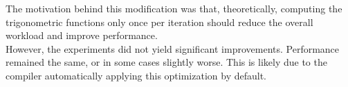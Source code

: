 \noindent
The motivation behind this modification was that, theoretically, computing the trigonometric functions only once per iteration should reduce the overall workload and improve performance.\\

\noindent
However, the experiments did not yield significant improvements. Performance remained the same, or in some cases slightly worse. This is likely due to the compiler automatically applying this optimization by default.

